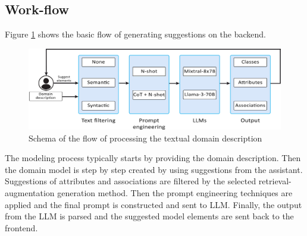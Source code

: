 \subsection{Work-flow}

Figure \ref{fig:work-flow} shows the basic flow of generating suggestions on the backend.

\begin{figure}[!h]
    \centering
    \includegraphics[scale=0.23]{img/work-flow.jpg}
    \caption{\centering Schema of the flow of processing the textual domain description}
    \label{fig:work-flow}
\end{figure}

The modeling process typically starts by providing the domain description. Then the domain model is step by step created by using suggestions from the assistant. Suggestions of attributes and associations are filtered by the selected retrieval-augmentation generation method. Then the prompt engineering techniques are applied and the final prompt is constructed and sent to LLM. Finally, the output from the LLM is parsed and the suggested model elements are sent back to the frontend.
